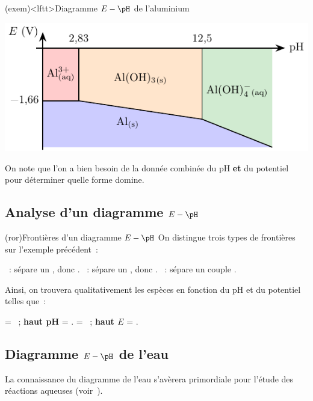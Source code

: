 \documentclass[../../main/main.tex]{subfiles}
\begin{document}
\begin{tcb*}(exem)<lftt>{Diagramme $E-\pH$ de l'aluminium}
	\begin{center}
		\includegraphics[scale=1.5]{eph_al}
	\end{center}
	On note que l'on a bien besoin de la donnée combinée du pH \textbf{et} du
	potentiel pour déterminer quelle forme domine.
\end{tcb*}

\subsection{Analyse d'un diagramme $E-\pH$}
\begin{tcb*}[breakable](ror){Frontières d'un diagramme $E-\pH$}
	On distingue trois types de frontières sur l'exemple précédent~:
	\begin{itemize}
		~: sépare un , donc .
		~: sépare un , donc .
		~: sépare un couple .
	\end{itemize}
	Ainsi, on trouvera qualitativement les espèces en fonction du pH et du
	potentiel telles que~:
	\begin{itemize}
		 = ~; \textbf{haut pH} = \xul{\psw{base}}.
		 = ~; \textbf{haut $E$} =
		\xul{\psw{oxydant}}.
	\end{itemize}
\end{tcb*}

\subsection{Diagramme $E-\pH$ de l'eau}
La connaissance du diagramme de l'eau s'avèrera primordiale pour l'étude des
réactions aqueuses (voir~).
\end{document}
